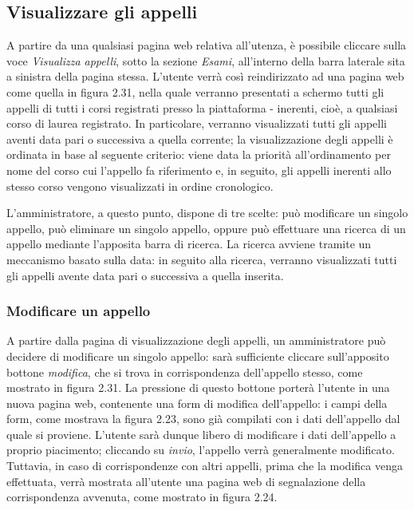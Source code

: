 \documentclass [a4paper,11pt]{book}
\begin{document}
\medskip

\subsection{Visualizzare gli appelli}

A partire da una qualsiasi pagina web relativa all'utenza, è possibile cliccare sulla voce \emph{Visualizza appelli}, sotto la sezione \emph{Esami}, all'interno della barra laterale sita a sinistra della pagina stessa. L'utente verrà così reindirizzato ad una pagina web come quella in figura 2.31, nella quale verranno presentati a schermo tutti gli appelli di tutti i corsi registrati presso la piattaforma - inerenti, cioè, a qualsiasi corso di laurea registrato. In particolare, verranno visualizzati tutti gli appelli aventi data pari o successiva a quella corrente; la visualizzazione degli appelli è ordinata in base al seguente criterio: viene data la priorità all'ordinamento per nome del corso cui l'appello fa riferimento e, in seguito, gli appelli inerenti allo stesso corso vengono visualizzati in ordine cronologico.

L'amministratore, a questo punto, dispone di tre scelte: può modificare un singolo appello, può eliminare un singolo appello, oppure può effettuare una ricerca di un appello mediante l'apposita barra di ricerca. La ricerca avviene tramite un meccanismo basato sulla data: in seguito alla ricerca, verranno visualizzati tutti gli appelli avente data pari o successiva a quella inserita.

\medskip

\subsubsection{Modificare un appello}

A partire dalla pagina di visualizzazione degli appelli, un amministratore può decidere di modificare un singolo appello: sarà sufficiente cliccare sull'apposito bottone \emph{modifica}, che si trova in corrispondenza dell'appello stesso, come mostrato in figura 2.31. La pressione di questo bottone porterà l'utente in una nuova pagina web, contenente una form di modifica dell'appello: i campi della form, come mostrava la figura 2.23, sono già compilati con i dati dell'appello dal quale si proviene. L'utente sarà dunque libero di modificare i dati dell'appello a proprio piacimento; cliccando su \emph{invio}, l'appello verrà generalmente modificato. Tuttavia, in caso di corrispondenze con altri appelli, prima che la modifica venga effettuata, verrà mostrata all'utente una pagina web di segnalazione della corrispondenza avvenuta, come mostrato in figura 2.24.
\end{document}
